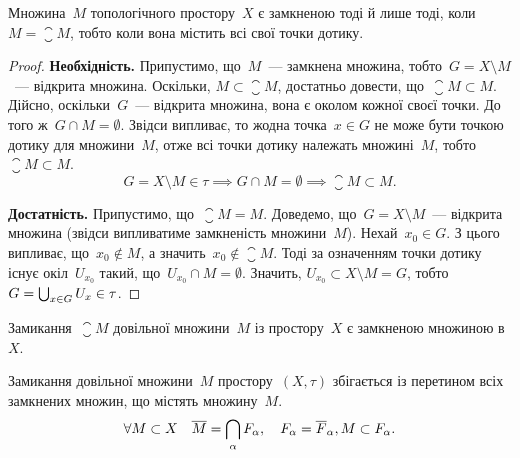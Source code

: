 \begin{theorem}
    Множина~$M$ топологічного простору~$X$ є замкненою тоді й лише тоді, коли~$M = \closure M$, тобто коли вона містить всі свої точки дотику.
\end{theorem}

\begin{proof}
    \textbf{Необхідність.} Припустимо, що~$M$~--- замкнена множина, тобто~$G = X \setminus M$~--- відкрита множина. Оскільки, $M \subset \closure M$, достатньо довести, що~$\closure M \subset M$. Дійсно, оскільки~$G$~--- відкрита множина, вона є околом кожної своєї точки. До того ж~$G \cap M = \emptyset$. Звідси випливає, то жодна точка~$x \in G$ не може бути точкою дотику для множини~$M$, отже всі точки дотику належать множині~$M$, тобто~$\closure M \subset M$.
    \begin{equation*}
        G = X \setminus M \in \tau \implies G \cap M = \emptyset \implies \closure M \subset M.
    \end{equation*}

    \textbf{Достатність.} Припустимо, що~$\closure M = M$. Доведемо, що~$G = X \setminus M$~--- відкрита множина (звідси випливатиме замкненість множини~$M$). Нехай~$x_0 \in G$. З цього випливає, що~$x_0 \not\in M$, а значить~$x_0 \not\in \closure M$. Тоді за означенням точки дотику існує окіл~$U_{x_0}$ такий, що~$U_{x_0} \cap M = \emptyset$. Значить, $U_{x_0} \subset X \setminus M = G$, тобто~$G = \operatorname*{\bigcup}_{x \in G} U_x \in \tau$.
\end{proof}

\begin{corollary}
    Замикання~$\closure M$ довільної множини~$M$ із простору~$X$ є замкненою множиною в~$X$.
\end{corollary}

\begin{theorem}
    Замикання довільної множини~$M$ простору~$(X, \tau)$ збігається із перетином всіх замкнених множин, що містять множину~$M$.
    \begin{equation*}
        \forall M \subset X \quad \overline{M} = \operatorname*{\bigcap}_\alpha F_\alpha, \quad F_\alpha = \overline{F}_\alpha, M \subset F_\alpha.
    \end{equation*}
\end{theorem}

